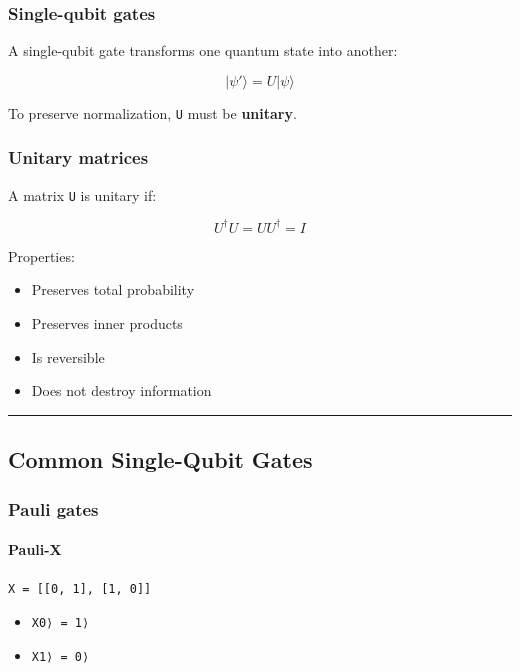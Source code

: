 \documentclass[
]{article}
\providecommand{\tightlist}{%
  \setlength{\itemsep}{0pt}\setlength{\parskip}{0pt}}
\begin{document}
\subsubsection{Single-qubit gates}\label{single-qubit-gates}

A single-qubit gate transforms one quantum state into another:

$$|\psi'\rangle = U|\psi\rangle$$

To preserve normalization, \texttt{U} must be \textbf{unitary}.

\subsubsection{Unitary matrices}\label{unitary-matrices}

A matrix \texttt{U} is unitary if:

\[
U^{\dagger}U = UU^{\dagger} = I
\]

Properties:

\begin{itemize}
\tightlist
\item
  Preserves total probability
\item
  Preserves inner products
\item
  Is reversible
\item
  Does not destroy information
\end{itemize}

\begin{center}\rule{0.5\linewidth}{0.5pt}\end{center}

\subsection{Common Single-Qubit Gates}\label{common-single-qubit-gates}

\subsubsection{Pauli gates}\label{pauli-gates}

\paragraph{Pauli-X}\label{pauli-x}

\texttt{X\ =\ {[}{[}0,\ 1{]},\ {[}1,\ 0{]}{]}}

\begin{itemize}
\tightlist
\item
  \texttt{X\textbar{}0⟩\ =\ \textbar{}1⟩}
\item
  \texttt{X\textbar{}1⟩\ =\ \textbar{}0⟩}
\end{itemize}
\end{document}
